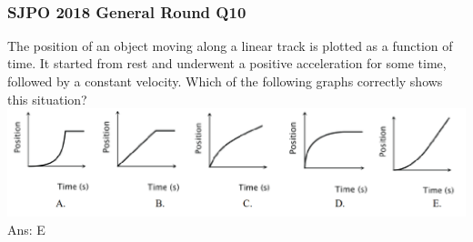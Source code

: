 \documentclass{article}
\begin{document}
\\[20pt]
\begin{samepage}
\subsubsection{SJPO 2018 General Round Q10} The position of an object moving along a linear track is plotted as a function of time. It started from rest and underwent a positive acceleration for some time, followed by a constant velocity. Which of the following graphs correctly shows this situation?\\
\includegraphics[width=\linewidth]{2018q10.png}\\
Ans: \ifpaper E \fi\\
\end{samepage}
\end{document}
